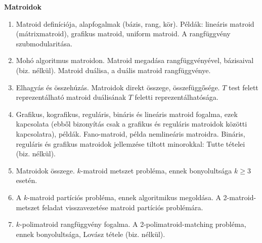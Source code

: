 \vspace{3mm}
\textbf{Matroidok}
\begin{enumerate}[resume]
\item	Matroid definíciója, alapfogalmak (bázis, rang, kör). Példák: lineáris matroid (mátrixmatroid), grafikus matroid, uniform matroid. A rangfüggvény szubmodularitása.
\item	Mohó algoritmus matroidon. Matroid megadása rangfüggvényével, bázisaival (biz. nélkül). Matroid duálisa, a duális matroid rangfüggvénye.
\item	Elhagyás és összehúzás. Matroidok direkt összege, összefüggősége. $T$ test felett reprezentálható matroid duálisának $T$ feletti reprezentálhatósága.
\item	Grafikus, kografikus, reguláris, bináris és lineáris matroid fogalma, ezek kapcsolata (ebből bizonyítás csak a grafikus és reguláris matroidok közötti kapcsolatra), példák. Fano-matroid, példa nemlineáris matroidra. Bináris, reguláris és grafikus matroidok jellemzése tiltott minorokkal: Tutte tételei (biz. nélkül).
\item	Matroidok összege. $k$-matroid metszet probléma, ennek bonyolultsága $k\geq3$ esetén.
\item	A $k$-matroid partíciós probléma, ennek algoritmikus megoldása. A 2-matroid-metszet feladat visszavezetése matroid partíciós problémára.
\item	$k$-polimatroid rangfüggvény fogalma. A 2-polimatroid-matching probléma, ennek bonyolultsága, Lovász tétele (biz. nélkül).
\end{enumerate}


